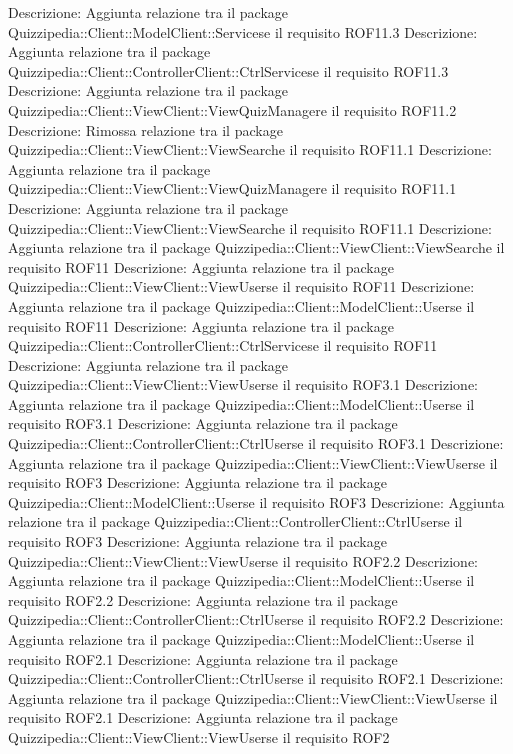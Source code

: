 Descrizione: Aggiunta relazione tra il package Quizzipedia::Client::ModelClient::Servicese il requisito ROF11.3 
Descrizione: Aggiunta relazione tra il package Quizzipedia::Client::ControllerClient::CtrlServicese il requisito ROF11.3 
Descrizione: Aggiunta relazione tra il package Quizzipedia::Client::ViewClient::ViewQuizManagere il requisito ROF11.2 
Descrizione: Rimossa relazione tra il package Quizzipedia::Client::ViewClient::ViewSearche il requisito ROF11.1 
Descrizione: Aggiunta relazione tra il package Quizzipedia::Client::ViewClient::ViewQuizManagere il requisito ROF11.1 
Descrizione: Aggiunta relazione tra il package Quizzipedia::Client::ViewClient::ViewSearche il requisito ROF11.1 
Descrizione: Aggiunta relazione tra il package Quizzipedia::Client::ViewClient::ViewSearche il requisito ROF11 
Descrizione: Aggiunta relazione tra il package Quizzipedia::Client::ViewClient::ViewUserse il requisito ROF11 
Descrizione: Aggiunta relazione tra il package Quizzipedia::Client::ModelClient::Userse il requisito ROF11 
Descrizione: Aggiunta relazione tra il package Quizzipedia::Client::ControllerClient::CtrlServicese il requisito ROF11 
Descrizione: Aggiunta relazione tra il package Quizzipedia::Client::ViewClient::ViewUserse il requisito ROF3.1 
Descrizione: Aggiunta relazione tra il package Quizzipedia::Client::ModelClient::Userse il requisito ROF3.1 
Descrizione: Aggiunta relazione tra il package Quizzipedia::Client::ControllerClient::CtrlUserse il requisito ROF3.1 
Descrizione: Aggiunta relazione tra il package Quizzipedia::Client::ViewClient::ViewUserse il requisito ROF3 
Descrizione: Aggiunta relazione tra il package Quizzipedia::Client::ModelClient::Userse il requisito ROF3 
Descrizione: Aggiunta relazione tra il package Quizzipedia::Client::ControllerClient::CtrlUserse il requisito ROF3 
Descrizione: Aggiunta relazione tra il package Quizzipedia::Client::ViewClient::ViewUserse il requisito ROF2.2 
Descrizione: Aggiunta relazione tra il package Quizzipedia::Client::ModelClient::Userse il requisito ROF2.2 
Descrizione: Aggiunta relazione tra il package Quizzipedia::Client::ControllerClient::CtrlUserse il requisito ROF2.2 
Descrizione: Aggiunta relazione tra il package Quizzipedia::Client::ModelClient::Userse il requisito ROF2.1 
Descrizione: Aggiunta relazione tra il package Quizzipedia::Client::ControllerClient::CtrlUserse il requisito ROF2.1 
Descrizione: Aggiunta relazione tra il package Quizzipedia::Client::ViewClient::ViewUserse il requisito ROF2.1 
Descrizione: Aggiunta relazione tra il package Quizzipedia::Client::ViewClient::ViewUserse il requisito ROF2 
